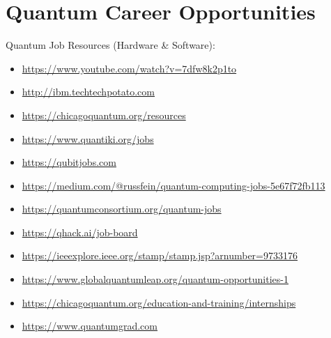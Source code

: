 \chapter{\LARGE{Quantum Career Opportunities}}

\begin{flushleft}
\large{Quantum Job Resources (Hardware \& Software):}
\end{flushleft}

\large\begin{itemize}
\item\url{https://www.youtube.com/watch?v=7dfw8k2p1to}
\item\url{http://ibm.techtechpotato.com}
\item\url{https://chicagoquantum.org/resources} 
\item\url{https://www.quantiki.org/jobs} 
\item\url{https://qubitjobs.com} 
\item\url{https://medium.com/@russfein/quantum-computing-jobs-5e67f72fb113} 
\item\url{https://quantumconsortium.org/quantum-jobs} 
\item\url{https://qhack.ai/job-board} 
\item\url{https://ieeexplore.ieee.org/stamp/stamp.jsp?arnumber=9733176} 
\item\url{https://www.globalquantumleap.org/quantum-opportunities-1} 
\item\url{https://chicagoquantum.org/education-and-training/internships} 
\item\url{https://www.quantumgrad.com}

\end{itemize}
